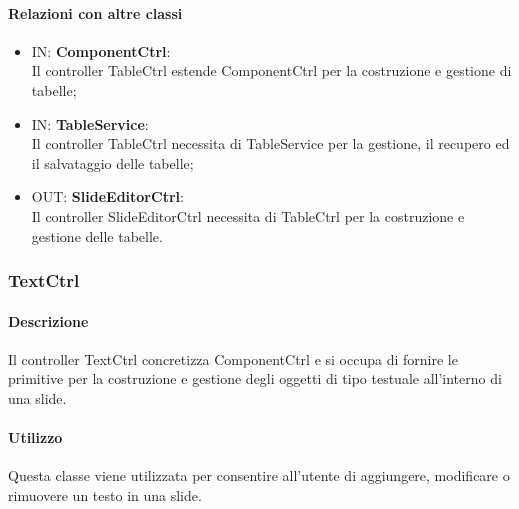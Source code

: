 	\paragraph{Relazioni con altre classi}
	\begin{itemize}
 	\item IN: \textbf{ComponentCtrl}:\\
	 	Il controller TableCtrl estende ComponentCtrl per la costruzione e gestione di tabelle;
	\item IN: \textbf{TableService}:\\
		Il controller TableCtrl necessita di TableService per la gestione, il recupero ed il salvataggio delle tabelle;
	\item OUT: \textbf{SlideEditorCtrl}:\\
		Il controller SlideEditorCtrl necessita di TableCtrl per la costruzione e gestione delle tabelle. 	
	\end{itemize}

\newpage
\subsubsection{TextCtrl}
   \paragraph{Descrizione}
	Il controller TextCtrl concretizza ComponentCtrl e si occupa di fornire le primitive per la costruzione e gestione degli oggetti di tipo testuale all'interno di una slide.
		
	\paragraph{Utilizzo}
	Questa classe viene utilizzata per consentire all'utente di aggiungere, modificare o rimuovere un testo in una slide.
	
